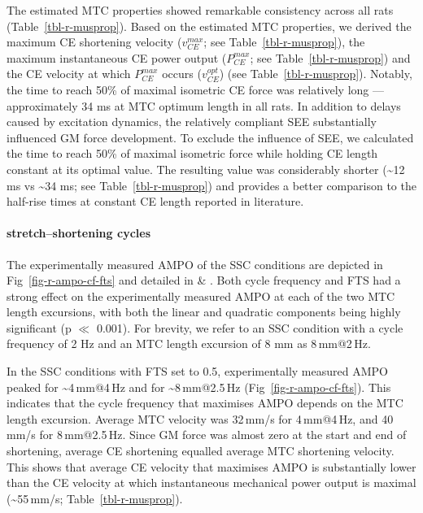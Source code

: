 \documentclass[
  10pt,
  letterpaper,
]{article}
\begin{document}
The estimated MTC properties showed remarkable consistency across all
rats (Table~\ref{tbl-r-musprop}). Based on the estimated MTC properties,
we derived the maximum CE shortening velocity (\(v_{CE}^{max}\); see
Table~\ref{tbl-r-musprop}), the maximum instantaneous CE power output
(\(P_{CE}^{max}\); see Table~\ref{tbl-r-musprop}) and the CE velocity at
which \(P_{CE}^{max}\) occurs (\(v_{CE}^{opt}\)) (see
Table~\ref{tbl-r-musprop}). Notably, the time to reach 50\% of maximal
isometric CE force was relatively long --- approximately 34 ms at MTC
optimum length in all rats. In addition to delays caused by excitation
dynamics, the relatively compliant SEE substantially influenced GM force
development. To exclude the influence of SEE, we calculated the time to
reach 50\% of maximal isometric force while holding CE length constant
at its optimal value. The resulting value was considerably shorter
(\textasciitilde12 ms vs \textasciitilde34 ms; see
Table~\ref{tbl-r-musprop}) and provides a better comparison to the
half-rise times at constant CE length reported in literature.

\begin{table}[H]

\caption{\label{tbl-r-musprop}Estimated MTC properties of rat \emph{m.
gastorcnemius medialis} as well as metrics derived from these
properties.}

\centering{



}

\end{table}%

\paragraph{stretch--shortening cycles}\label{stretchshortening-cycles}

The experimentally measured AMPO of the SSC conditions are depicted in
Fig~\ref{fig-r-ampo-cf-fts} and detailed in { \&
}. Both cycle frequency and FTS had a strong effect on
the experimentally measured AMPO at each of the two MTC length
excursions, with both the linear and quadratic components being highly
significant (p \(\ll\) 0.001). For brevity, we refer to an SSC condition
with a cycle frequency of 2 Hz and an MTC length excursion of 8 mm as
8\,mm@2\,Hz.

In the SSC conditions with FTS set to 0.5, experimentally measured AMPO
peaked for \textasciitilde4\,mm@4\,Hz and for
\textasciitilde8\,mm@2.5\,Hz (Fig~\ref{fig-r-ampo-cf-fts}). This
indicates that the cycle frequency that maximises AMPO depends on the
MTC length excursion. Average MTC velocity was 32\,mm/s for 4\,mm@4\,Hz,
and 40\,mm/s for 8\,mm@2.5\,Hz. Since GM force was almost zero at the
start and end of shortening, average CE shortening equalled average MTC
shortening velocity. This shows that average CE velocity that maximises
AMPO is substantially lower than the CE velocity at which instantaneous
mechanical power output is maximal (\textasciitilde55\,mm/s;
Table~\ref{tbl-r-musprop}).
\end{document}
